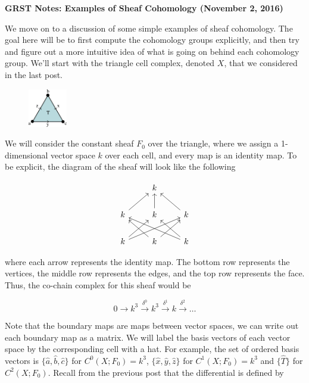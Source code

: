 \documentclass{article}
\begin{document}
\begin{center}
	\large \textbf{GRST Notes: Examples of Sheaf Cohomology (November 2, 2016)} \\
\end{center}


We move on to a discussion of some simple examples of sheaf cohomology. The goal here will be to first compute the cohomology groups explicitly, and then try and figure out a more intuitive idea of what is going on behind each cohomology group. We’ll start with the triangle cell complex, denoted $X$, that we considered in the last post.

\begin{figure}[!htbp]
\centering
	\includegraphics[width=0.15\textwidth]{triangle_dir.png}
\end{figure}

We will consider the constant sheaf $F_0$ over the triangle, where we assign a 1-dimensional vector space $k$ over each cell, and every map is an identity map. To be explicit, the diagram of the sheaf will look like the following

\[
\begin{tikzcd}
	& k & \\
	k \arrow{ur} & k \arrow{u} & k \arrow{ul} \\
	k \arrow{ur} \arrow{urr} & k \arrow{ur} \arrow{ul} & k \arrow{ul} \arrow{ull}
\end{tikzcd}
\]

where each arrow represents the identity map. The bottom row represents the vertices, the middle row represents the edges, and the top row represents the face. Thus, the co-chain complex for this sheaf would be

\begin{equation}
	0 \xrightarrow{} k^3 \xrightarrow{\delta^0} k^3 \xrightarrow{\delta^1} k \xrightarrow{\delta^2}  \ldots
\end{equation}

Note that the boundary maps are maps between vector spaces, we can write out each boundary map as a matrix. We will label the basis vectors of each vector space by the corresponding cell with a hat. For example, the set of ordered basis vectors is $\{\hat{a},\hat{b},\hat{c}\}$ for $C^0(X;F_0) = k^3$, $\{\hat{x},\hat{y},\hat{z}\}$ for $C^1(X;F_0) = k^3$ and $\{\hat{T}\}$ for $C^2(X;F_0)$. Recall from the previous post that the differential is defined by
\end{document}
